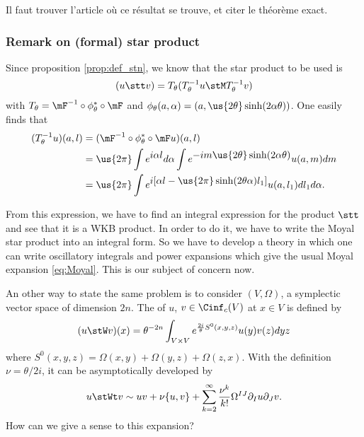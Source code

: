 \begin{probleme}
Il faut trouver l'article où ce résultat se trouve, et citer le théorème exact.
\label{ProbEnonSLdef}
\end{probleme}

\subsubsection{Remark on (formal) star product}\label{subsec:rem_on_sp}

Since proposition \ref{prop:def_stn}, we know that the star product to be used is
\[
    (u\stt v)=T_{\theta}(T_{\theta}^{-1} u\stM T_{\theta}^{-1} v)
\]
with $T_{\theta}=\mF^{-1}\circ\phi^*_{\theta}\circ\mF$ and $\phi_{\theta}(a,\alpha)=(a,\us{2\theta}\sinh(2\alpha\theta))$. One easily finds that
\begin{equation}
\begin{split}
   (T^{-1}_{\theta} u)(a,l)&=(\mF^{-1}\circ\phi^*_{\theta}\circ\mF u)(a,l)\\
                        &=\us{2\pi}\int e^{\displaystyle i\alpha l}d\alpha\int
                          e^{\displaystyle-im\us{2\theta}\sinh(2\alpha\theta)}u(a,m)dm\\
			&=\us{2\pi}\int
			  e^{\displaystyle i[\alpha l-\us{2\pi}\sinh(2\theta\alpha)l_1] }
			  u(a,l_1)dl_1d\alpha.
\end{split}
\end{equation}

From this expression, we have to find an integral expression for the product $\stt$ and see that it is a WKB product. In order to do it, we have to write the Moyal star product into an integral form. So we have to develop a theory in which one can write oscillatory integrals and power expansions which give the usual Moyal expansion \eqref{eq:Moyal}. This is our subject of concern now.

An other way to state the same problem is to consider $(V,\Omega)$, a symplectic vector space of dimension $2n$. The  of $u$, $v\in\Cinf_c(V)$ at $x\in V$ is defined by
\[
  (u\stW v)(x)=\theta^{-2n}\int_{V\times V}e^{\frac{2i}{\theta}S^0(x,y,z)}u(y)v(z)dyz
\]
where $S^0(x,y,z)=\Omega(x,y)+\Omega(y,z)+\Omega(z,x)$. With the
 definition  $\nu=\theta/2i$, it can be asymptotically developed by
\[
  u\stWt v\sim uv+\nu\{u,v\}+\sum_{k=2}^{\infty}\frac{\nu^k}{k!}\Omega^{IJ}\partial_Iu\partial_Jv.
\]
How can we give a sense to this expansion?

